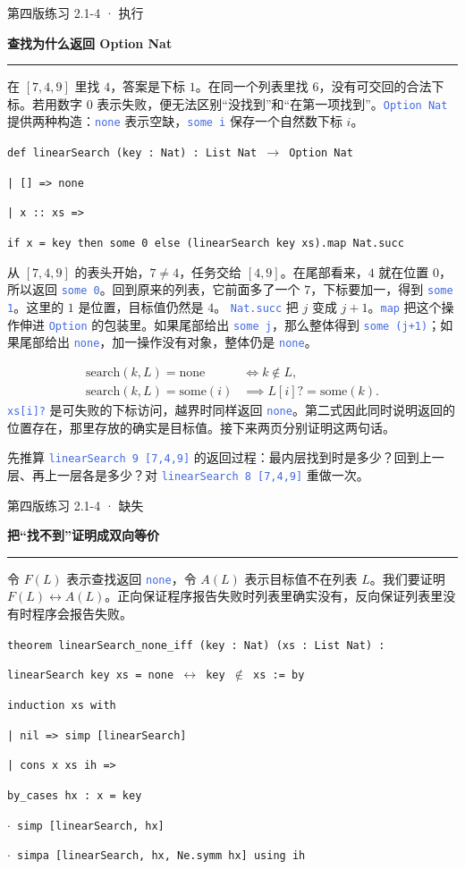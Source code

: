 \documentclass[UTF8,11pt,a4paper,fontset=fandol]{ctexart}
\newcommand{\HandoutLesson}[2]{%
  \par{\small\heiti\color{BrickRed}#1}\par\vspace{3pt}
  {\fontsize{21}{27}\selectfont\heiti\bfseries #2}\par
  \textcolor{BrickRed}{\rule{\linewidth}{.7pt}}\par}
\newcommand{\HandoutBox}[1]{%
  \par\noindent\begingroup\setlength{\fboxsep}{8pt}%
  \colorbox{BrickRed!9}{\parbox{\dimexpr\linewidth-16pt\relax}{#1}}\endgroup\par}
\newcommand{\src}[1]{\textcolor{RoyalBlue}{\texttt{#1}}}
\newcommand{\subhead}[1]{\par\vspace{3pt}{\heiti\bfseries\color{RoyalBlue}#1}\par}
\newenvironment{leanblock}{\par\smallskip\noindent\begin{lrbox}{\leanbox}\begin{minipage}{\dimexpr\linewidth-12pt\relax}\raggedright\small\setlength{\parskip}{0pt}}{\end{minipage}\end{lrbox}\colorbox{RoyalBlue!6}{\usebox{\leanbox}}\par\smallskip}
\newcommand{\lineofcode}[2]{\noindent\hspace*{#1em}\strut\texttt{#2}\par}
\begin{document}
\par{}
\clearpage{}\label{p16}\HandoutLesson{第四版练习 2.1-4 · 执行}{查找为什么返回 Option Nat}
在 $[7,4,9]$ 里找 $4$，答案是下标 $1$。在同一个列表里找 $6$，没有可交回的合法下标。若用数字 $0$ 表示失败，便无法区别“没找到”和“在第一项找到”。\src{Option Nat} 提供两种构造：\src{none} 表示空缺，\src{some i} 保存一个自然数下标 $i$。
\begin{leanblock}
\lineofcode{0.0}{def linearSearch (key : Nat) : List Nat \ensuremath{\to} Option Nat}
\lineofcode{1.0}{| [] => none}
\lineofcode{1.0}{| x :: xs =>}
\lineofcode{2.0}{if x = key then some 0 else (linearSearch key xs).map Nat.succ}
\end{leanblock}
\subhead{为什么尾部的答案要加一}
从 $[7,4,9]$ 的表头开始，$7\ne4$，任务交给 $[4,9]$。在尾部看来，$4$ 就在位置 $0$，所以返回 \src{some 0}。回到原来的列表，它前面多了一个 $7$，下标要加一，得到 \src{some 1}。这里的 $1$ 是位置，目标值仍然是 $4$。
\src{Nat.succ} 把 $j$ 变成 $j+1$。\src{map} 把这个操作伸进 \src{Option} 的包装里。如果尾部给出 \src{some j}，那么整体得到 \src{some (j+1)}；如果尾部给出 \src{none}，加一操作没有对象，整体仍是 \src{none}。
\subhead{对两种返回值各问一句}
\[
\begin{aligned}
\mathrm{search}(k,L)=\mathrm{none}
   &\iff k\notin L,\\
\mathrm{search}(k,L)=\mathrm{some}(i)
   &\implies L[i]?=\mathrm{some}(k).
\end{aligned}
\]
\src{xs[i]?} 是可失败的下标访问，越界时同样返回 \src{none}。第二式因此同时说明返回的位置存在，那里存放的确实是目标值。接下来两页分别证明这两句话。
\HandoutBox{先推算 \src{linearSearch 9 [7,4,9]} 的返回过程：最内层找到时是多少？回到上一层、再上一层各是多少？对 \src{linearSearch 8 [7,4,9]} 重做一次。}
\par{}
\clearpage{}\label{p17}\HandoutLesson{第四版练习 2.1-4 · 缺失}{把“找不到”证明成双向等价}
令 $F(L)$ 表示查找返回 \src{none}，令 $A(L)$ 表示目标值不在列表 $L$。我们要证明 $F(L)\leftrightarrow A(L)$。正向保证程序报告失败时列表里确实没有，反向保证列表里没有时程序会报告失败。
\begin{leanblock}
\lineofcode{0.0}{theorem linearSearch\_none\_iff (key : Nat) (xs : List Nat) :}
\lineofcode{2.0}{linearSearch key xs = none \ensuremath{\leftrightarrow} key \ensuremath{\notin} xs := by}
\lineofcode{1.0}{induction xs with}
\lineofcode{1.0}{| nil => simp [linearSearch]}
\lineofcode{1.0}{| cons x xs ih =>}
\lineofcode{2.0}{by\_cases hx : x = key}
\lineofcode{2.0}{\ensuremath{\cdot} simp [linearSearch, hx]}
\lineofcode{2.0}{\ensuremath{\cdot} simpa [linearSearch, hx, Ne.symm hx] using ih}
\end{leanblock}
\end{document}

